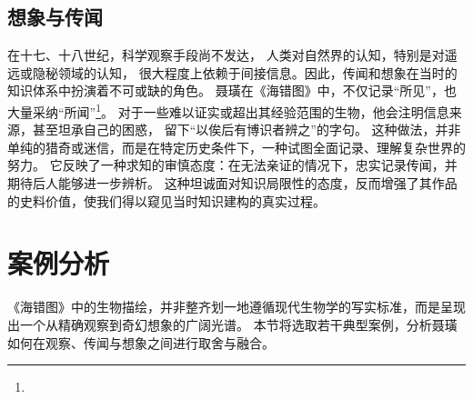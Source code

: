 \documentclass{source/Paper}
\begin{document}
\subsection{想象与传闻}
在十七、十八世纪，科学观察手段尚不发达，
人类对自然界的认知，特别是对遥远或隐秘领域的认知，
很大程度上依赖于间接信息。因此，传闻和想象在当时的知识体系中扮演着不可或缺的角色。
聂璜在《海错图》中，不仅记录“所见”，也大量采纳“所闻”\footnote{}。
对于一些难以证实或超出其经验范围的生物，他会注明信息来源，甚至坦承自己的困惑，
留下“以俟后有博识者辨之”的字句。
这种做法，并非单纯的猎奇或迷信，而是在特定历史条件下，一种试图全面记录、理解复杂世界的努力。
它反映了一种求知的审慎态度：在无法亲证的情况下，忠实记录传闻，并期待后人能够进一步辨析。
这种坦诚面对知识局限性的态度，反而增强了其作品的史料价值，使我们得以窥见当时知识建构的真实过程。

\section{案例分析}
《海错图》中的生物描绘，并非整齐划一地遵循现代生物学的写实标准，而是呈现出一个从精确观察到奇幻想象的广阔光谱。
本节将选取若干典型案例，分析聂璜如何在观察、传闻与想象之间进行取舍与融合。
\end{document}
